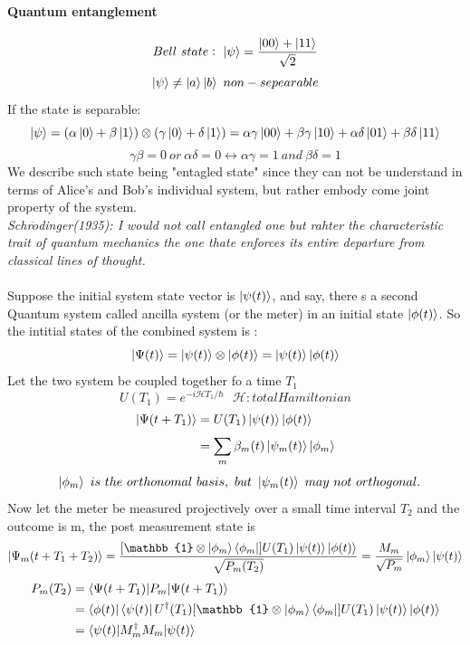 \documentclass[]{article}
\theoremstyle{nonumberplain}
\begin{document}
\paragraph{Quantum entanglement}%
\label{par:quantum_entanglement}
\[
Bell\ state:\ \ket{\psi}=\frac{\ket{00}+\ket{11}}{\sqrt{2}}
\] 
\[
\ket{\psi}\neq \ket{a}\ket{b}\ non-sepearable
\] 
If the state is separable:
\[
	\ket{\psi} = (\alpha\ket{0}+\beta\ket{1})\otimes(\gamma\ket{0}+\delta\ket{1}) = \alpha\gamma\ket{00}+\beta\gamma\ket{10}+\alpha\delta\ket{01}+\beta\delta\ket{11}
\] 
\[
\gamma\beta =  0 \  or \ \alpha\delta=0 \leftrightarrow \alpha\gamma =1 \ and \ \beta\delta = 1
\] 
We describe such state being "entagled state" since they can not be understand in terms of Alice's and Bob's individual system, but rather embody come joint property of the system.\\
\newpage
\textit{Schr$\ddot{o}$dinger(1935): I would not call entangled one but rahter the characteristic trait of quantum mechanics the one thate enforces its entire departure from classical lines of thought.}\\ \\
Suppose the initial system state vector is $\ket{\psi(t)}$, and say, there s a second Quantum system called ancilla system (or the meter) in an initial state $\ket{\phi(t)}$. So the intitial states of the combined system is :
\[
	\ket{\Psi(t)}=\ket{\psi(t)}\otimes\ket{\phi(t)}=\ket{\psi(t)}\ket{\phi(t)}
\] 
Let the two system be coupled together fo a time $T_{1}$
\[
	U(T_1) = e^{-i\mathcal{H}T_{1}/\hbar} \ \ \ \mathcal{H}: total Hamiltonian 
\] 
\begin{equation*}
\begin{aligned}
	\ket{\Psi(t+T_1)}&=U(T_{1})\ket{\psi(t)}\ket{\phi(t)}\\
						  &= \sum^{}_{m} \beta_{m}(t)\ket{\psi_{m}(t)}\ket{\phi_{m}} 
\end{aligned}
\end{equation*}
\[
\ \ \ket{\phi_{m}}\ is\ the\ orthonomal\  basis,\ but\ \ket{\psi_{m}(t)}\ may\ not\ orthogonal. 
\] 
Now let the meter be measured projectively over a small time interval $T_{2}$ and the outcome is m, the post measurement state is 
\[
	\ket{\Psi_{m}(t+T_{1}+T_{2})} = \frac{[\mathbb{1}\otimes \ket{\phi_{m}}\bra{\phi_{m}}]U(T_{1})\ket{\psi(t)}\ket{\phi(t)}}{\sqrt{P_{m}(T_{2})}}=\frac{M_{m}}{\sqrt{P_{m}}}\ket{\phi_{m}}\ket{\psi(t)}
\] 
\begin{equation*}
\begin{aligned}
	P_{m}(T_{2}) &= \braket{\Psi(t+T_{1})|P_{m}|\Psi(t+T_{1})} \\
					 &= \bra{\phi(t)}\bra{\psi(t)}U^{\dagger}(T_{1})[\mathbb{1}\otimes \ket{\phi_{m}}\bra{\phi_{m}}]U(T_{1})\ket{\psi(t)}\ket{\phi(t)}\\
					 &= \braket{\psi(t)|M_{m}^{\dagger}M_{m}|\psi(t)}\ \\ 
\end{aligned}
\end{equation*}
\end{document}
